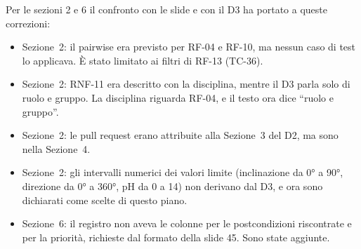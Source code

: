 Per le sezioni 2 e 6 il confronto con le slide e con il D3 ha portato a queste correzioni:
\begin{itemize}
    \item Sezione~2: il pairwise era previsto per RF-04 e RF-10, ma nessun caso di test lo applicava. È stato limitato ai filtri di RF-13 (TC-36).
    \item Sezione~2: RNF-11 era descritto con la disciplina, mentre il D3 parla solo di ruolo e gruppo. La disciplina riguarda RF-04, e il testo ora dice ``ruolo e gruppo''.
    \item Sezione~2: le pull request erano attribuite alla Sezione~3 del D2, ma sono nella Sezione~4.
    \item Sezione~2: gli intervalli numerici dei valori limite (inclinazione da 0° a 90°, direzione da 0° a 360°, pH da 0 a 14) non derivano dal D3, e ora sono dichiarati come scelte di questo piano.
    \item Sezione~6: il registro non aveva le colonne per le postcondizioni riscontrate e per la priorità, richieste dal formato della slide 45. Sono state aggiunte.
\end{itemize}
